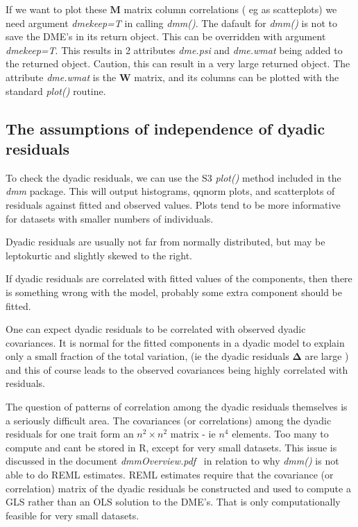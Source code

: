 \documentclass[titlepage]{article}  %
\begin{document}
If we want to plot these $\bm{M}$ matrix column correlations ( eg as scatteplots) we need argument {\em dmekeep=T} in calling {\em dmm()}. The dafault for {\em dmm()} is not to save the DME's in its return object. This can be overridden with argument {\em dmekeep=T}. This results in 2 attributes {\em dme.psi} and {\em dme.wmat} being added to the returned object. Caution, this can result in a very large returned object. The attribute {\em dme.wmat} is the $\bm{W}$ matrix, and its columns can be plotted with the standard {\em plot()} routine.

\subsection{The assumptions of independence of dyadic residuals}
To check the dyadic residuals, we can use the S3 {\em plot()} method included in the {\em dmm} package. This will output histograms, qqnorm plots, and scatterplots of residuals against fitted and observed values. Plots tend to be more informative for datasets with smaller numbers of individuals.

Dyadic residuals are usually not far from normally distributed, but may be leptokurtic and slightly skewed to the right.

If dyadic residuals are correlated with fitted values of the components, then there is something wrong with the model, probably some extra component should be fitted. 

One can expect dyadic residuals to be correlated with observed dyadic covariances. It is normal for the fitted components in a dyadic model to explain only a small fraction of the total variation, (ie the dyadic residuals $\bm\Delta$ are large ) and this of course leads to the observed covariances being highly correlated with residuals.

The question of patterns of correlation among the dyadic residuals themselves is a seriously difficult area. The covariances (or correlations) among the dyadic residuals for one trait form an $n^{2} \times n^{2}$ matrix - ie $n^{4}$ elements. Too many to compute and cant be stored in R, except for very small datasets. This issue is discussed in the document {\em dmmOverview.pdf}~\cite{jack:15} in relation to why {\em dmm()} is not able to do REML estimates. REML estimates require that the covariance (or correlation) matrix of the dyadic residuals be constructed and used to compute a GLS rather than an OLS solution to the DME's. That is only computationally feasible for very small datasets.
\end{document}

